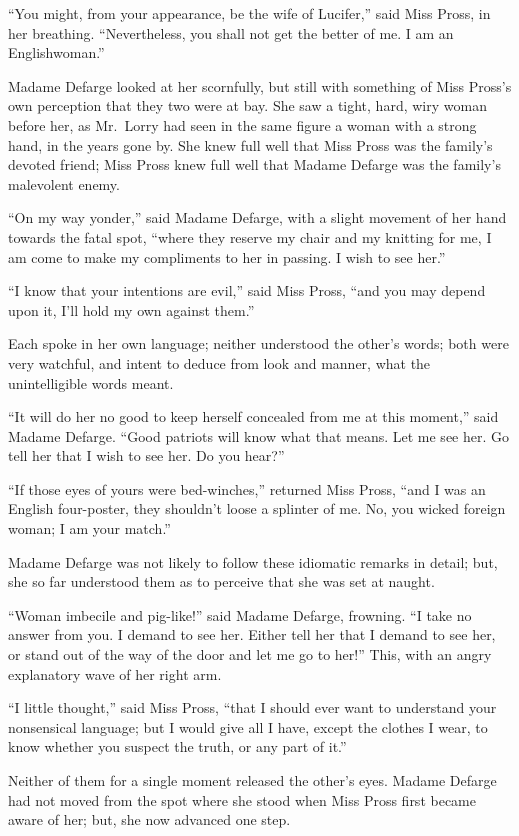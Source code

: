 ``You might, from your appearance, be the wife of Lucifer,'' said Miss
Pross, in her breathing.  ``Nevertheless, you shall not get the better
of me. I am an Englishwoman.''

Madame Defarge looked at her scornfully, but still with something of
Miss Pross's own perception that they two were at bay.  She saw a
tight, hard, wiry woman before her, as Mr.\ Lorry had seen in the same
figure a woman with a strong hand, in the years gone by.  She knew
full well that Miss Pross was the family's devoted friend; Miss Pross
knew full well that Madame Defarge was the family's malevolent enemy.

``On my way yonder,'' said Madame Defarge, with a slight movement of
her hand towards the fatal spot, ``where they reserve my chair and my
knitting for me, I am come to make my compliments to her in passing.
I wish to see her.''

``I know that your intentions are evil,'' said Miss Pross, ``and you may
depend upon it, I'll hold my own against them.''

Each spoke in her own language; neither understood the other's words;
both were very watchful, and intent to deduce from look and manner,
what the unintelligible words meant.

``It will do her no good to keep herself concealed from me at this
moment,'' said Madame Defarge.  ``Good patriots will know what that means.
Let me see her.  Go tell her that I wish to see her.  Do you hear?''

``If those eyes of yours were bed-winches,'' returned Miss Pross, ``and
I was an English four-poster, they shouldn't loose a splinter of me.
No, you wicked foreign woman; I am your match.''

Madame Defarge was not likely to follow these idiomatic remarks in
detail; but, she so far understood them as to perceive that she was
set at naught.

``Woman imbecile and pig-like!'' said Madame Defarge, frowning.
``I take no answer from you.  I demand to see her.  Either tell her
that I demand to see her, or stand out of the way of the door and let
me go to her!''  This, with an angry explanatory wave of her right arm.

``I little thought,'' said Miss Pross, ``that I should ever want to
understand your nonsensical language; but I would give all I have,
except the clothes I wear, to know whether you suspect the truth, or
any part of it.''

Neither of them for a single moment released the other's eyes.
Madame Defarge had not moved from the spot where she stood when Miss
Pross first became aware of her; but, she now advanced one step.

